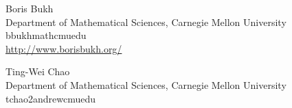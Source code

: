 \documentclass{daj}
\theoremstyle{definition}
\begin{document}
\begin{dajauthors}
\begin{authorinfo}[pgom]
  Boris Bukh\\
  Department of Mathematical Sciences, Carnegie Mellon University\\
  bbukh\imageat{}math\imagedot{}cmu\imagedot{}edu \\
  \url{http://www.borisbukh.org/}
\end{authorinfo}
\begin{authorinfo}[joha]
  Ting-Wei Chao\\
  Department of Mathematical Sciences, Carnegie Mellon University\\
  tchao2\imageat{}andrew\imagedot{}cmu\imagedot{}edu
\end{authorinfo}
\end{dajauthors}
\end{document}

